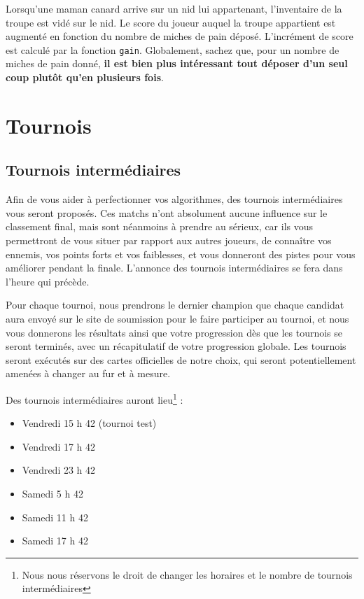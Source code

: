 Lorsqu'une maman canard arrive sur un nid lui appartenant, l'inventaire de la troupe
est vidé sur le nid. Le score du joueur auquel la troupe appartient est augmenté en fonction
du nombre de miches de pain déposé. L'incrément de score est calculé par la fonction \texttt{gain}.
Globalement, sachez que, pour un nombre de miches de pain donné,
\textbf{il est bien plus intéressant tout déposer d'un seul coup plutôt qu'en plusieurs fois}.


\section{Tournois}

\subsection{Tournois intermédiaires}

Afin de vous aider à perfectionner vos algorithmes, des tournois intermédiaires
vous seront proposés. Ces matchs n’ont absolument aucune influence sur le
classement final, mais sont néanmoins à prendre au sérieux, car ils vous
permettront de vous situer par rapport aux autres joueurs, de connaître vos
ennemis, vos points forts et vos faiblesses, et vous donneront des pistes pour
vous améliorer pendant la finale. L’annonce des tournois intermédiaires se fera
dans l’heure qui précède.

Pour chaque tournoi, nous prendrons le dernier
champion que chaque candidat aura envoyé sur le site de soumission pour le
faire participer au tournoi, et nous vous donnerons les résultats ainsi que
votre progression dès que les tournois se seront terminés, avec un
récapitulatif de votre progression globale. Les tournois seront exécutés sur
des cartes officielles de notre choix, qui seront potentiellement amenées à
changer au fur et à mesure.

Des tournois intermédiaires auront lieu\footnote{Nous nous réservons le droit de changer les horaires et le nombre de tournois intermédiaires} :
\begin{itemize}
    \item Vendredi 15 h 42 (tournoi test)
    \item Vendredi 17 h 42
    \item Vendredi 23 h 42
    \item Samedi 5 h 42
    \item Samedi 11 h 42
    \item Samedi 17 h 42
\end{itemize}

